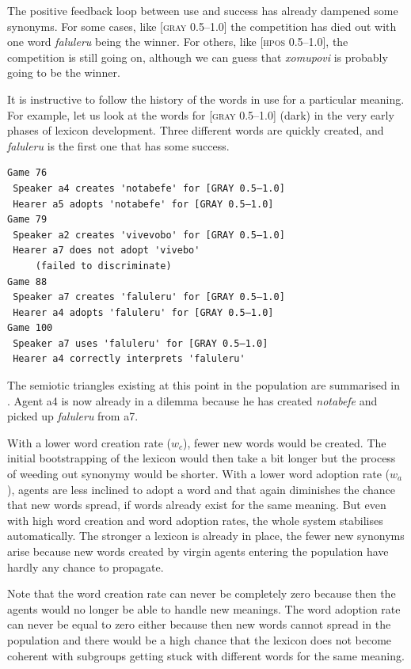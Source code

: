 \clearpage 
The positive feedback loop between use and success
has already dampened some synonyms. For some cases, like [\textsc{gray} 0.5–1.0] the competition has died out 
with one word \textit{faluleru} being the winner. 
For others, like [\textsc{hpos} 0.5–1.0], the competition 
is still going on, although we can guess
that \textit{xomupovi} is probably going to be the winner. 

It is instructive to follow the history of the words 
in use for a particular meaning. For 
example, let us look at the words for [\textsc{gray} 0.5–1.0] 
(dark) in the very early phases of lexicon development.
Three different words are quickly created, and 
\textit{faluleru} is the first one that has some success. 
\begin{verbatim}
Game 76
 Speaker a4 creates 'notabefe' for [GRAY 0.5–1.0]
 Hearer a5 adopts 'notabefe' for [GRAY 0.5–1.0]
Game 79 
 Speaker a2 creates 'vivevobo' for [GRAY 0.5–1.0]
 Hearer a7 does not adopt 'vivebo' 
     (failed to discriminate)
Game 88 
 Speaker a7 creates 'faluleru' for [GRAY 0.5–1.0]
 Hearer a4 adopts 'faluleru' for [GRAY 0.5–1.0]
Game 100 
 Speaker a7 uses 'faluleru' for [GRAY 0.5–1.0]
 Hearer a4 correctly interprets 'faluleru'
\end{verbatim}
The semiotic triangles existing at this point in the population are 
summarised in . 
Agent {\bfshape  a4} is now already in a dilemma because he has created
\textit{notabefe} and picked up \textit{faluleru} from {\bfshape  a7}. 


  
With a lower word creation rate ($w_{c}$), 
fewer new words would be created. The initial bootstrapping
of the lexicon would then take a bit longer but the 
process of weeding out synonymy would be shorter. 
With a lower word adoption rate ($w_{a}$), agents are
less inclined to adopt a word and that again diminishes
the chance that new words spread, if words already 
exist for the same meaning. But even with high word creation
and word adoption rates, the whole system stabilises automatically. 
The stronger a lexicon is already in place, the fewer
new synonyms arise because new words
created by virgin agents entering the population have hardly 
any chance to propagate. 

Note that the word creation 
rate can never be completely zero because then the agents
would no longer be able to handle new meanings. The word 
adoption rate can never be equal to zero either because then 
new words cannot spread in the population and there
would be a high chance that the lexicon does not become coherent
with subgroups getting stuck with different
words for the same meaning. 

